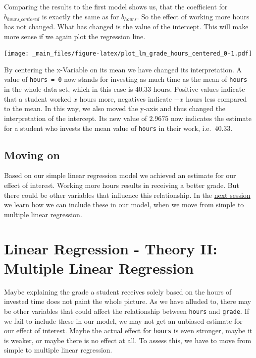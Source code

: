 \documentclass[
]{book}
\begin{document}
Comparing the results to the first model shows us, that the coefficient for
\(b_{hours\_centered}\) is exactly the same as for \(b_{hours}\). So the effect
of working more hours has not changed. What has changed is the value of the
intercept. This will make more sense if we again plot the regression line.

\texttt{[image: \_main\_files/figure-latex/plot\_lm\_grade\_hours\_centered\_0-1.pdf]}

By centering the x-Variable on its mean we have changed its interpretation.
A value of \texttt{hours\ =\ 0} now stands for investing as much time as the mean
of \texttt{hours} in the whole data set, which in this case is \(40.33\) hours. Positive
values indicate that a student worked \(x\) hours more, negatives indicate \(-x\)
hours less compared to the mean. In this way, we also moved the y-axis and thus
changed the interpretation of the intercept. Its new value of \(2.9675\) now
indicates the estimate for a student who invests the mean value of \texttt{hours} in
their work, i.e.~\(40.33\).

\hypertarget{moving-on-1}{%
\section{Moving on}\label{moving-on-1}}

Based on our simple linear regression model we achieved an estimate for our
effect of interest. Working more hours results in receiving a better grade.
But there could be other variables that influence this relationship. In the
\protect\hyperlink{lin-t-2}{next session} we learn how we can include these in our model, when we move from
simple to multiple linear regression.

\hypertarget{lin-t-2}{%
\chapter{Linear Regression - Theory II: Multiple Linear Regression}\label{lin-t-2}}

Maybe explaining the grade a student receives solely based on the hours of
invested time does not paint the whole picture. As we have alluded to, there
may be other variables that could affect the relationship between \texttt{hours} and
\texttt{grade}.
If we fail to include these in our model, we may not get an unbiased estimate
for our effect of interest. Maybe the actual effect for \texttt{hours} is even stronger,
maybe it is weaker, or maybe there is no effect at all.
To assess this, we have to move from simple to multiple linear regression.
\end{document}
